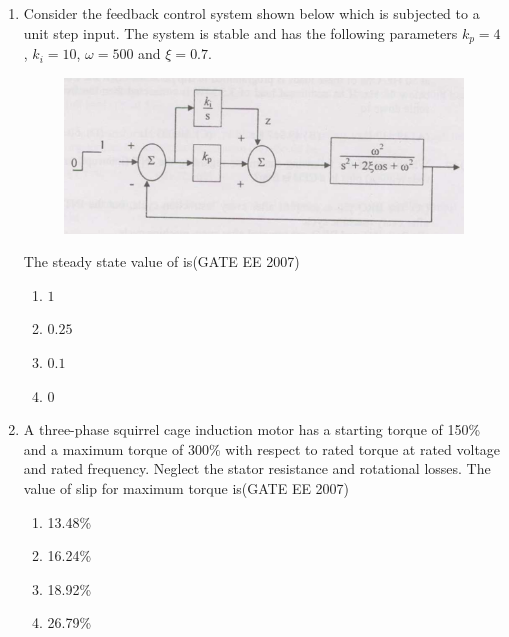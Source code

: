 \documentclass[a4paper,10pt]{exam}
\theoremstyle{remark}
\begin{document}
\begin{enumerate}
\vfill
{}
\newpage

\item  \hspace{0.5em} \parbox[t]{0.85\textwidth}{%
Consider the feedback control system shown below which is subjected to a unit step input. The system is stable and has the following parameters $k_p = 4$, $k_i = 10$, $\omega = 500$ and $\xi = 0.7$.
} 

\begin{figure}[H]
    \centering
    \includegraphics[width=0.7\linewidth]{figs/Q 65.png} \caption{}     \label{fig:myfigure}
\end{figure}

The steady state value of  is\hfill{(GATE EE 2007)}
\begin{multicols}{4}
\begin{enumerate}
\item $1$  
\item $0.25$  
\item $0.1$  
\item $0$  
 \end{enumerate}
\end{multicols}

\item  A three-phase squirrel cage induction motor has a starting torque of 150\% and a maximum torque of 300\% with respect to rated torque at rated voltage and rated frequency. Neglect the stator resistance and rotational losses. The value of slip for maximum torque is\hfill{(GATE EE 2007)}

\begin{multicols}{4}
\begin{enumerate}
\item  13.48\% 
\item 16.24\% 
\item 18.92\% 
\item 26.79\%
\end{enumerate}
\end{multicols}


\end{enumerate}
\end{document}
